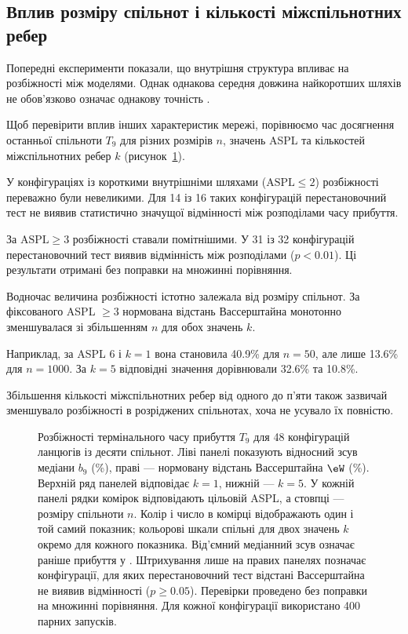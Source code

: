 \subsection{Вплив розміру спільнот
і кількості міжспільнотних ребер}
\label{sec:res_size}

Попередні експерименти показали,
що внутрішня структура впливає
на розбіжності між моделями.
Однак однакова середня довжина
найкоротших шляхів не обов'язково
означає однакову точність \TS{}.

Щоб перевірити вплив інших
характеристик мережі, порівнюємо
час досягнення останньої спільноти
$T_9$ для різних розмірів $n$,
значень ASPL та кількостей
міжспільнотних ребер $k$
(рисунок~\ref{fig:accuracy_map}).

У конфігураціях із короткими
внутрішніми шляхами
($\mathrm{ASPL}\leq2$)
розбіжності переважно були невеликими.
Для 14 із 16 таких конфігурацій
перестановочний тест не виявив
статистично значущої відмінності
між розподілами часу прибуття.

За $\mathrm{ASPL}\geq3$
розбіжності ставали помітнішими.
У 31 із 32 конфігурацій
перестановочний тест виявив
відмінність між розподілами
($p<0.01$). Ці результати
отримані без поправки
на множинні порівняння.

Водночас величина розбіжності
істотно залежала від розміру
спільнот. За фіксованого
ASPL $\geq3$ нормована
відстань Вассерштайна
монотонно зменшувалася
зі збільшенням $n$
для обох значень $k$.

Наприклад, за ASPL 6 і $k=1$
вона становила 40.9\%
для $n=50$, але лише 13.6\%
для $n=1000$.
За $k=5$ відповідні значення
дорівнювали 32.6\% та 10.8\%.

Збільшення кількості
міжспільнотних ребер від одного
до п'яти також зазвичай
зменшувало розбіжності
в розріджених спільнотах,
хоча не усувало їх повністю.

\begin{figure}[tbp]
\centering
\caption{%
Розбіжності термінального часу
прибуття $T_9$ для 48 конфігурацій
ланцюгів із десяти спільнот.
Ліві панелі показують відносний зсув медіани
$b_9$ (\%), праві --- нормовану відстань
Вассерштайна $\eW$ (\%). Верхній ряд панелей
відповідає $k=1$, нижній --- $k=5$.
У кожній панелі рядки комірок відповідають
цільовій ASPL, а стовпці --- розміру спільноти $n$.
Колір і число в комірці відображають один і той самий
показник; кольорові шкали спільні для двох значень $k$
окремо для кожного показника.
Від'ємний медіанний зсув означає раніше прибуття у \TS{}.
Штрихування лише на правих панелях позначає
конфігурації, для яких перестановочний тест відстані
Вассерштайна не виявив відмінності ($p\geq0.05$).
Перевірки проведено без поправки
на множинні порівняння.
Для кожної конфігурації
використано 400 парних запусків.
}
\label{fig:accuracy_map}
\end{figure}

